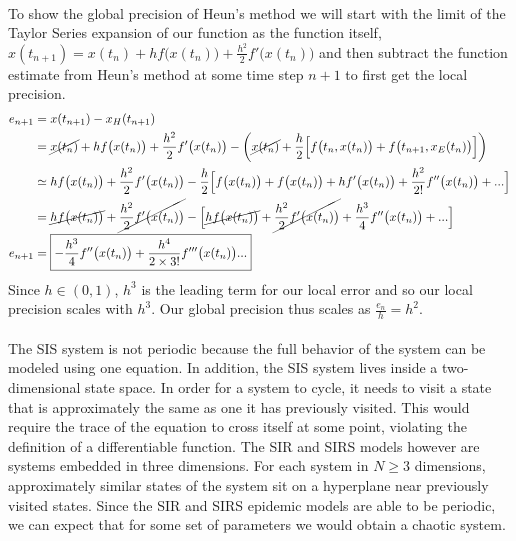 \documentclass[11pt, oneside]{article}   	%
\newcommand{\prob}[2]{
\indent \\
\noindent{\color{green!50!blue}\bf {\large#1.}}
{\normalfont #2}
}
\begin{document}
\prob{4}{To show the global precision of Heun's method we will start with the limit of the Taylor Series expansion of our function as the function itself, $x(t_{n+1}) = x(t_n) + h f\big(x(t_n)\big) + \frac{h^2}{2}f'\big(x(t_n)\big)$} and then subtract the function estimate from Heun's method at some time step $n+1$ to first get the local precision.
	\begin{align*}
		e_{n+1} &= x(t_{n+1}) - x_H(t_{n+1})
		\\
		&=
		\cancel{x(t_n)} + h f\big(x(t_n)\big) + \frac{h^2}{2}f'\big(x(t_n)\big)
		-
		\bigg(
		\cancel{x(t_n)} + \frac{h}{2}
			\Big[
			f\big(t_n,x(t_n)\big) + f\big(t_{n+1},x_E(t_n)\big)
			\Big]
		\bigg)
		\\
		&\simeq
		h f\big(x(t_n)\big) + \frac{h^2}{2}f'\big(x(t_n)\big)
		-
		\frac{h}{2}
			\Big[
			f\big(x(t_n)\big) + f\big(x(t_n)\big) + h f'\big(x(t_n)\big) + \frac{h^2}{2!}f''\big(x(t_n)\big) + ...
			\Big]
		\\
		&=
		\cancel{h f\big(x(t_n)\big)}
		+
		\cancel{\frac{h^2}{2}f'\big(x(t_n)\big)}
		-
		\Big[
			\cancel{h f\big(x(t_n)\big)}
			+
			\cancel{\frac{h^2}{2} f'\big(x(t_n)\big)}
			+
			\frac{h^3}{4}f''\big(x(t_n)\big)
			+ ...
		\Big]
		\\
		e_{n+1}
		&=
		\boxed{
		-
		\frac{h^3}{4}f''\big(x(t_n)\big)
		+
		\frac{h^4}{2\times3!}f'''\big(x(t_n)\big)...
		}
	\end{align*}
	Since $h \in (0,1)$, $h^3$ is the leading term for our local error and so our local precision scales with $h^3$. Our global precision thus scales as $\boxed{\frac{e_n}{h} = h^2}$.\\

\prob{5}{
The SIS system is not periodic because the full behavior of the system can be modeled using one equation. In addition, the SIS system lives inside a two-dimensional state space. In order for a system to cycle, it needs to visit a state that is approximately the same as one it has previously visited. This would require the trace of the equation to cross itself at some point, violating the definition of a differentiable function. The SIR and SIRS models however are systems embedded in three dimensions. For each system in $N\geq3$ dimensions, approximately similar states of the system sit on a hyperplane near previously visited states. Since the SIR and SIRS epidemic models are able to be periodic, we can expect that for some set of parameters we would obtain a chaotic system.}
\end{document}
